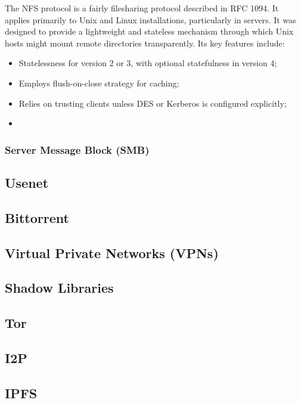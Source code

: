 The NFS protocol is a fairly filesharing protocol described in RFC
1094\cite{NFSNetworkFile1989}. It applies primarily to Unix and Linux installations, particularly in servers. It was designed to provide a lightweight and stateless mechanism through which Unix hosts might mount remote directories transparently. Its key features include:
\begin{itemize}[nosep]
  \item Statelessness for version 2 or 3, with optional statefulness in version 4;
  \item Employs flush-on-close strategy for caching;
  \item Relies on trusting clients unless DES or Kerberos is configured explicitly;
  \item
\end{itemize}

\subsubsection{Server Message Block (SMB)}


\subsection{Usenet}


\subsection{Bittorrent}

\subsection{Virtual Private Networks (VPNs)}

\subsection{Shadow Libraries}

\subsection{Tor}
\subsection{I2P}

\subsection{IPFS}
